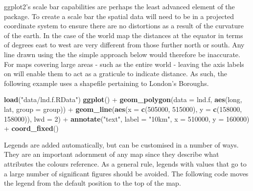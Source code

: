 \documentclass[]{article}
\newenvironment{Shaded}{}{}
\newcommand{\KeywordTok}[1]{\textcolor[rgb]{0.00,0.44,0.13}{\textbf{{#1}}}}
\newcommand{\DataTypeTok}[1]{\textcolor[rgb]{0.56,0.13,0.00}{{#1}}}
\newcommand{\DecValTok}[1]{\textcolor[rgb]{0.25,0.63,0.44}{{#1}}}
\newcommand{\StringTok}[1]{\textcolor[rgb]{0.25,0.44,0.63}{{#1}}}
\newcommand{\NormalTok}[1]{{#1}}
\begin{document}

ggplot2's scale bar capabilities are perhaps the least advanced element
of the package. To create a scale bar the spatial data will need to be in
a projected coordinate system to ensure there are no distortions as a
result of the curvature of the earth. In the case of the world map the
distances at the equator in terms of degrees east to west are very
different from those further north or south. Any line drawn using the
the simple approach below would therefore be inaccurate. For maps
covering large areas - such as the entire world - leaving the axis
labels on will enable them to act as a graticule to indicate distance.
As such, the following example uses a shapefile pertaining to London's
Boroughs.

\begin{Shaded}
\begin{Highlighting}[]
\KeywordTok{load}\NormalTok{(}\StringTok{"data/lnd.f.RData"}\NormalTok{)}
\KeywordTok{ggplot}\NormalTok{() + }\KeywordTok{geom_polygon}\NormalTok{(}\DataTypeTok{data =} \NormalTok{lnd.f, }\KeywordTok{aes}\NormalTok{(long, lat, }\DataTypeTok{group =} \NormalTok{group)) + }\KeywordTok{geom_line}\NormalTok{(}\KeywordTok{aes}\NormalTok{(}\DataTypeTok{x =} \KeywordTok{c}\NormalTok{(}\DecValTok{505000}\NormalTok{, }
    \DecValTok{515000}\NormalTok{), }\DataTypeTok{y =} \KeywordTok{c}\NormalTok{(}\DecValTok{158000}\NormalTok{, }\DecValTok{158000}\NormalTok{)), }\DataTypeTok{lwd =} \DecValTok{2}\NormalTok{) + }\KeywordTok{annotate}\NormalTok{(}\StringTok{"text"}\NormalTok{, }\DataTypeTok{label =} \StringTok{"10km"}\NormalTok{, }
    \DataTypeTok{x =} \DecValTok{510000}\NormalTok{, }\DataTypeTok{y =} \DecValTok{160000}\NormalTok{) + }\KeywordTok{coord_fixed}\NormalTok{()}
\end{Highlighting}
\end{Shaded}


Legends are added automatically, but can be customised in a number of
ways. They are an important adornment of any map since they describe
what attributes the colours reference. As a general rule, legends with values that go to a large number of significant figures should be avoided. The following code moves the legend from the default position to the top of the map.
\end{document}
